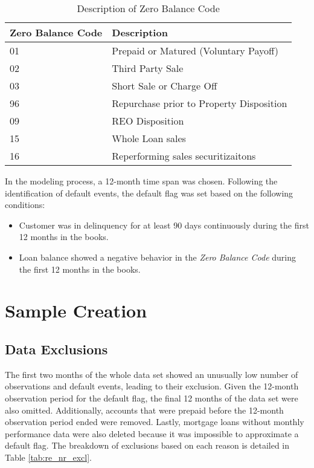 \begin{table}[H]
\centering
\begin{tabular}{ l l }\toprule
\textbf{Zero Balance Code} & \textbf{Description}            \\\midrule
01                & Prepaid or Matured (Voluntary Payoff)    \\
02                & Third Party Sale                         \\
03                & Short Sale or Charge Off                 \\
96                & Repurchase prior to Property Disposition \\
09                & REO Disposition                          \\
15                & Whole Loan sales                         \\
16                & Reperforming sales securitizaitons \\\bottomrule
\end{tabular}%
\caption{Description of Zero Balance Code}
\label{tab:re_ZB_Descr}
\end{table}

In the modeling process, a 12-month time span was chosen. Following the identification of default events, the default flag was set based on the following conditions:

\begin{itemize}
  \item Customer was in delinquency for at least 90 days continuously during the first 12 months in the books.
  \item Loan balance showed a negative behavior in the \emph{Zero Balance Code} during the first 12 months in the books.
\end{itemize}

\section{Sample Creation}

\subsection{Data Exclusions}
The first two months of the whole data set showed an unusually low number of observations and default events, leading to their exclusion. Given the 12-month observation period for the default flag, the final 12 months of the data set were also omitted. Additionally, accounts that were prepaid before the 12-month observation period ended were removed. Lastly, mortgage loans without monthly performance data were also deleted because it was impossible to approximate a default flag. The breakdown of exclusions based on each reason is detailed in Table \ref{tab:re_nr_excl}.

